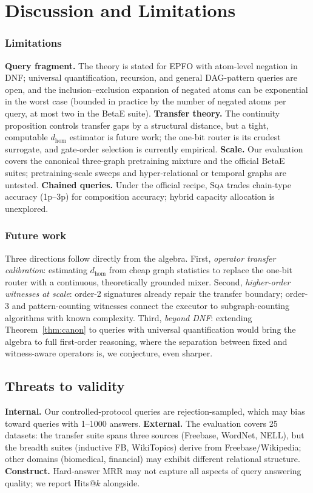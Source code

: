 \documentclass[journal]{IEEEtran}
\newcommand{\SQA}{\textsc{Sqa}}
\begin{document}
\section{Discussion and Limitations}\label{sec:disc}

\subsubsection{Limitations} \textbf{Query fragment.} The theory is
stated for EPFO with atom-level negation in DNF; universal quantification,
recursion, and general DAG-pattern queries are open, and the
inclusion--exclusion expansion of negated atoms can be exponential in the
worst case (bounded in practice by the number of negated atoms per
query, at most two in the BetaE suite). \textbf{Transfer theory.} The
continuity proposition controls transfer gaps by a structural distance,
but a tight, computable $d_{\mathrm{hom}}$ estimator is future work; the
one-bit router is its crudest surrogate, and gate-order selection is
currently empirical. \textbf{Scale.} Our evaluation covers the canonical
three-graph pretraining mixture and the official BetaE suites;
pretraining-scale sweeps and hyper-relational or temporal graphs are
untested. \textbf{Chained queries.} Under the official recipe, \SQA{}
trades chain-type accuracy (1p--3p) for composition accuracy; hybrid
capacity allocation is unexplored.

\subsubsection{Future work} Three directions follow directly from the
algebra. First, \emph{operator transfer calibration}: estimating
$d_{\mathrm{hom}}$ from cheap graph statistics to replace the one-bit
router with a continuous, theoretically grounded mixer. Second,
\emph{higher-order witnesses at scale}: order-2 signatures already repair
the transfer boundary; order-3 and pattern-counting witnesses connect the
executor to subgraph-counting algorithms with known complexity. Third,
\emph{beyond DNF}: extending Theorem~\ref{thm:canon} to queries with
universal quantification would bring the algebra to full first-order
reasoning, where the separation between fixed and witness-aware operators
is, we conjecture, even sharper.

\subsection{Threats to validity}
\textbf{Internal.} Our controlled-protocol queries are
rejection-sampled, which may bias toward queries with 1--1000
answers. \textbf{External.} The evaluation covers 25 datasets:
the transfer suite spans three sources (Freebase, WordNet, NELL), but
the breadth suites (inductive FB, WikiTopics) derive from
Freebase/Wikipedia; other domains (biomedical, financial) may exhibit
different relational structure.
\textbf{Construct.} Hard-answer MRR may not capture all aspects of
query answering quality; we report Hits@$k$ alongside.
\end{document}
